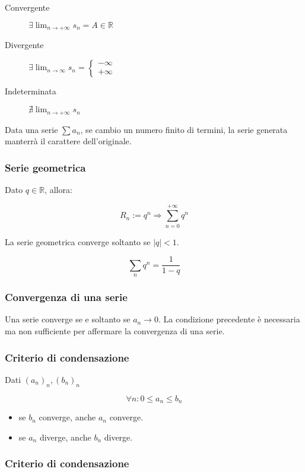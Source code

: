 \documentclass{article}
\begin{document}
\begin{description}
    \item[Convergente] $\exists \lim_{n \to +\infty} s_n = A \in \mathbb{R}$
    \item[Divergente] $\exists \lim_{n \to \infty} s_n = \begin{cases} -\infty\\ +\infty\end{cases}$
    \item[Indeterminata] $\nexists  \lim_{n \to +\infty} s_n$
\end{description}

\noindent
Data una serie $\sum a_n$, se cambio un numero finito di termini, la serie generata manterrà il carattere dell'originale.

\subsubsection{Serie geometrica}

Dato $q \in \mathbb{R}$, allora:

$$
R_n := q^n \Rightarrow \sum_{n = 0}^{+\infty} q^n
$$

\noindent
La serie geometrica converge soltanto se $|q| < 1$.

$$
\sum_{n} q^n = \frac{1}{1 - q}
$$

\subsubsection{Convergenza di una serie}

Una serie converge se e soltanto se $a_n \to 0$. La condizione precedente è necessaria ma non sufficiente per affermare la convergenza di una serie.

\subsubsection{Criterio di condensazione}

Dati $(a_n)_n, (b_n)_n$

$$
\forall n : 0 \leq a_n \leq b_n
$$

\begin{itemize}
    \item se $b_n$ converge, anche $a_n$ converge.
    \item se $a_n$ diverge, anche $b_n$ diverge.
\end{itemize}

\subsubsection{Criterio di condensazione}
\end{document}
